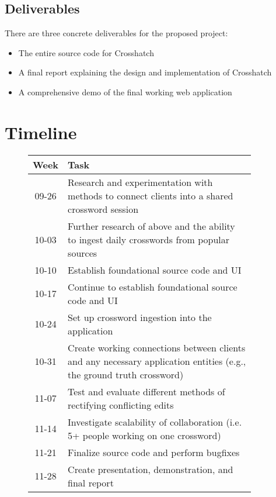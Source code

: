 \documentclass{article}
\begin{document}
\subsection{Deliverables}
There are three concrete deliverables for the proposed project:
\begin{itemize}
  \item The entire source code for Crosshatch
  \item A final report explaining the design and implementation of Crosshatch
  \item A comprehensive demo of the final working web application
\end{itemize}

\newpage
\section{Timeline}
\label{timeline}
\begin{figure}[h]
  \centering
  \begin{tabular}{| c | p{0.9\linewidth} |}
    \hline
    \textbf{Week} & \textbf{Task} \\ \hline
    09-26 & Research and experimentation with methods to connect
            clients into a shared crossword session \\ \hline
    10-03 & Further research of above and the ability to
            ingest daily crosswords from popular sources \\ \hline
    10-10 & Establish foundational source code and UI \\ \hline
    10-17 & Continue to establish foundational source code and UI \\ \hline
    10-24 & Set up crossword ingestion into the application \\ \hline
    10-31 & Create working connections between clients and any
            necessary application entities (e.g., the ground truth crossword) \\ \hline
    11-07 & Test and evaluate different methods of rectifying conflicting edits  \\ \hline
    11-14 & Investigate scalability of collaboration (i.e. 5+ people working on one crossword) \\ \hline
    11-21 & Finalize source code and perform bugfixes \\ \hline
    11-28 & Create presentation, demonstration, and final report \\ \hline

    \end{tabular}
\end{figure}
\end{document}
